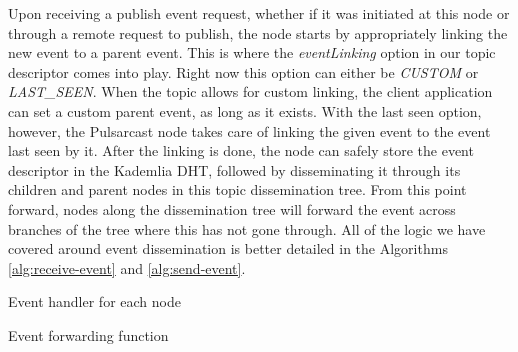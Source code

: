 Upon receiving a publish event request, whether if it was initiated at this
node or through a remote request to publish, the node starts by appropriately
linking the new event to a parent event. This is where the \emph{eventLinking}
option in our topic descriptor comes into play. Right now this option can
either be \emph{CUSTOM} or \emph{LAST\_SEEN}. When the topic allows for custom
linking, the client application can set a custom parent event, as long as it
exists. With the last seen option, however, the Pulsarcast node takes care of
linking the given event to the event last seen by it. After the linking is
done, the node can safely store the event descriptor in the Kademlia DHT,
followed by disseminating it through its children and parent nodes in this
topic dissemination tree. From this point forward, nodes along the
dissemination tree will forward the event across branches of the tree where
this has not gone through. All of the logic we have covered around event
dissemination is better detailed in the Algorithms \ref{alg:receive-event} and
\ref{alg:send-event}.

\begin{algorithm}
  \SetAlgoLined
  \caption{Event handler for each node}
    \label{alg:receive-event}
\end{algorithm}

\begin{algorithm}
  \SetAlgoLined
  \caption{Event forwarding function}
    \label{alg:send-event}
\end{algorithm}


